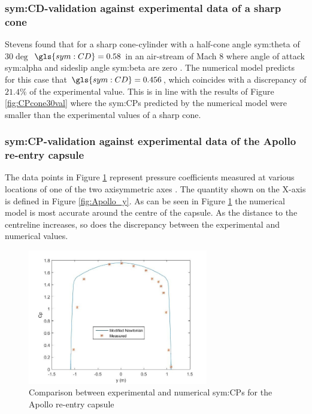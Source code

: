 \subsubsection{\gls{sym:CD}-validation against experimental data of a sharp cone}
\label{subsubsec:valsharpconeCD}
Stevens found that for a sharp cone-cylinder with a half-cone angle \gls{sym:theta} of $30\deg$ $\gls{sym:CD}=0.58$ in an air-stream of Mach $8$ where angle of attack \gls{sym:alpha} and sideslip angle \gls{sym:beta} are zero \cite{Stevens1950,AndersonJr.2007}. The numerical model predicts for this case that $\gls{sym:CD}=0.456$, which coincides with a discrepancy of $21.4\%$ of the experimental value. This is in line with the results of Figure \ref{fig:CPcone30val} where the \glspl{sym:CP} predicted by the numerical model were smaller than the experimental values of a sharp cone.

\subsubsection{\gls{sym:CP}-validation against experimental data of the Apollo re-entry capsule}
\label{subsubsec:Apollo_validation}
The data points in Figure \ref{fig:Apollo_cp} represent pressure coefficients measured at various locations of one of the two axisymmetric axes \cite{Bertin1966}. The quantity shown on the X-axis is defined in Figure \ref{fig:Apollo_y}. As can be seen in Figure \ref{fig:Apollo_cp} the numerical model is most accurate around the centre of the capsule. As the distance to the centreline increases, so does the discrepancy between the experimental and numerical values.

\begin{figure}[H]
	\centering
	\includegraphics[width=0.7\textwidth]{./Figure/Apollo_cp}
	\caption{Comparison between experimental and numerical \glspl{sym:CP} for the Apollo re-entry capsule}
	\label{fig:Apollo_cp}
\end{figure}

